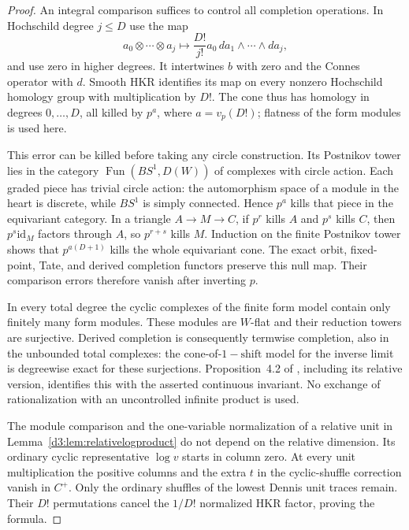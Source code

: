 \documentclass[11pt,a4paper]{amsart}
\numberwithin{equation}{section}
\theoremstyle{definition}
\theoremstyle{remark}
\begin{document}
\begin{proof}
An integral comparison suffices to control all completion operations.
In Hochschild degree $j\leq D$ use the map
\[
 a_0\otimes\cdots\otimes a_j\longmapsto
       \frac{D!}{j!}a_0\,da_1\wedge\cdots\wedge da_j,
\]
and use zero in higher degrees. It intertwines $b$ with zero and
the Connes operator with $d$. Smooth HKR identifies its map on every
nonzero Hochschild homology group with multiplication by $D!$.
The cone thus has homology in degrees $0,\ldots,D$, all killed by
$p^a$, where $a=v_p(D!)$; flatness of the form modules is used here.

This error can be killed before taking any circle construction.
Its Postnikov tower lies in the category
$\operatorname{Fun}(BS^1,D(W))$ of complexes with circle action.
Each graded piece has trivial circle action: the automorphism
space of a module in the heart is discrete, while $BS^1$ is simply
connected. Hence $p^a$ kills that piece in the equivariant category.
In a triangle $A\to M\to C$, if $p^r$ kills $A$ and $p^s$ kills
$C$, then $p^s\mathrm{id}_M$ factors through $A$, so $p^{r+s}$
kills $M$. Induction on the finite Postnikov tower shows that
$p^{a(D+1)}$ kills the whole equivariant cone.
The exact orbit, fixed-point, Tate, and derived completion functors
preserve this null map. Their comparison errors therefore vanish
after inverting $p$.

In every total degree the cyclic complexes of the finite form
model contain only finitely many form modules. These modules are
$W$-flat and their reduction towers are surjective. Derived
completion is consequently termwise completion, also in the
unbounded total complexes: the cone-of-$1-\mathrm{shift}$ model
for the inverse limit is degreewise exact for these surjections.
Proposition~4.2 of \cite{AMMN}, including its relative version,
identifies this with the asserted continuous invariant. No exchange
of rationalization with an uncontrolled infinite product is used.

The module comparison and the one-variable normalization of a
relative unit in Lemma~\ref{d3:lem:relativelogproduct} do not depend
on the relative dimension. Its ordinary cyclic representative
$\log v$ starts in column zero. At every unit multiplication the
positive columns and the extra $t$ in the cyclic-shuffle correction
vanish in $C^+$. Only the ordinary shuffles of the lowest Dennis
unit traces remain. Their $D!$ permutations cancel the $1/D!$
normalized HKR factor, proving the formula.
\end{proof}
\end{document}
